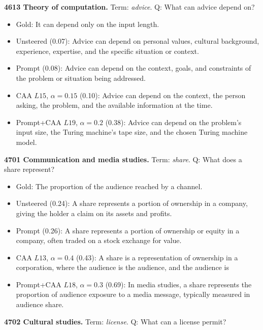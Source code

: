 \medskip\noindent\textbf{4613 Theory of computation.} Term: \emph{advice}.
Q: What can advice depend on?
\begin{itemize}\setlength{\itemsep}{0.15em}\setlength{\parsep}{0pt}\setlength{\topsep}{0.2em}
\item Gold: It can depend only on the input length.
\item Unsteered (0.07): Advice can depend on personal values, cultural background, experience, expertise, and the specific situation or context.
\item Prompt (0.08): Advice can depend on the context, goals, and constraints of the problem or situation being addressed.
\item CAA $L15$, $\alpha=0.15$ (0.10): Advice can depend on the context, the person asking, the problem, and the available information at the time.
\item Prompt+CAA $L19$, $\alpha=0.2$ (0.38): Advice can depend on the problem's input size, the Turing machine's tape size, and the chosen Turing machine model.
\end{itemize}
\medskip\noindent\textbf{4701 Communication and media studies.} Term: \emph{share}.
Q: What does a share represent?
\begin{itemize}\setlength{\itemsep}{0.15em}\setlength{\parsep}{0pt}\setlength{\topsep}{0.2em}
\item Gold: The proportion of the audience reached by a channel.
\item Unsteered (0.24): A share represents a portion of ownership in a company, giving the holder a claim on its assets and profits.
\item Prompt (0.26): A share represents a portion of ownership or equity in a company, often traded on a stock exchange for value.
\item CAA $L13$, $\alpha=0.4$ (0.43): A share is a representation of ownership in a corporation, where the audience is the audience, and the audience is
\item Prompt+CAA $L18$, $\alpha=0.3$ (0.69): In media studies, a share represents the proportion of audience exposure to a media message, typically measured in audience share.
\end{itemize}
\medskip\noindent\textbf{4702 Cultural studies.} Term: \emph{license}.
Q: What can a license permit?
